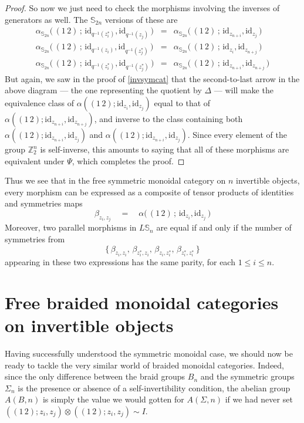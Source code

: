 \documentclass{amsbook} %
\newcommand{\id}{\textrm{id}}
\numberwithin{section}{chapter}
\begin{document}
\begin{proof}
So now we just need to check the morphisms involving the inverses of generators as well. The $\mathbb{S}_{2n}$ versions of these are
\[ \begin{array}{rll}
			\alpha_{\mathbb{S}_{2n}}\big( \, (1 \, 2) \, ; \, \id_{q^{-1}(z_i^*)}, \id_{q^{-1}(z_j)} \, \big) & = & \alpha_{\mathbb{S}_{2n}}\big( \, (1 \, 2) \, ; \, \id_{z_{n+i}}, \id_{z_j} \, \big) \\
			\alpha_{\mathbb{S}_{2n}}\big( \, (1 \, 2) \, ; \, \id_{q^{-1}(z_i)}, \id_{q^{-1}(z_j^*)} \, \big) & = & \alpha_{\mathbb{S}_{2n}}\big( \, (1 \, 2) \, ; \, \id_{z_i}, \id_{z_{n+j}} \, \big) \\
			\alpha_{\mathbb{S}_{2n}}\big( \, (1 \, 2) \, ; \, \id_{q^{-1}(z_i^*)}, \id_{q^{-1}(z_j^*)} \, \big) & = & \alpha_{\mathbb{S}_{2n}}\big( \, (1 \, 2) \, ; \, \id_{z_{n+i}}, \id_{z_{n+j}} \, \big)
		\end{array}
\]
But again, we saw in the proof of \cref{invsymcat} that the second-to-last arrow in the above diagram --- the one representing the quotient by $\Delta$ --- will make the equivalence class of $\alpha((1 \, 2);\id_{z_i}, \id_{z_j})$ equal to that of $\alpha((1 \, 2); \id_{z_{n+i}}, \id_{z_{n+j}})$, and inverse to the class containing both $\alpha((1 \, 2); \id_{z_{n+i}}, \id_{z_j})$ and $\alpha((1 \, 2); \id_{z_{n+i}}, \id_{z_j})$. Since every element of the group $\mathbb{Z}_2^{n}$ is self-inverse, this amounts to saying that all of these morphisms are equivalent under $\Psi$, which completes the proof. 
\end{proof}

Thus we see that in the free symmetric monoidal category on $n$ invertible objects, every morphism can be expressed as a composite of tensor products of identities and symmetries maps
\[ \beta_{z_i, z_j} \quad = \quad \alpha\big( \, (1 \, 2) \, ; \, \id_{z_i}, \id_{z_j} \, \big) \]
Moreover, two parallel morphisms in $L\mathbb{S}_n$ are equal if and only if the number of symmetries from
\[ \big\{ \, \beta_{z_i, z_i}, \, \beta_{z_i^*, z_i}, \, \beta_{z_i, z_i^*}, \, \beta_{z_i^*, z_i^*} \, \big\} \]
appearing in these two expressions has the same parity, for each $1 \le i \le n$.

\section{Free braided monoidal categories on invertible objects} 

Having successfully understood the symmetric monoidal case, we should now be ready to tackle the very similar world of braided monoidal categories. Indeed, since the only difference between the braid groups $B_{n}$ and the symmetric groups $\Sigma_{n}$ is the presence or absence of a self-invertibility condition, the abelian group $A(B,n)$ is simply the value we would gotten for $A(\Sigma,n)$ if we had never set $((1 \, 2); z_i, z_j) \otimes ((1 \, 2); z_i, z_j) \sim I$.
\end{document}
